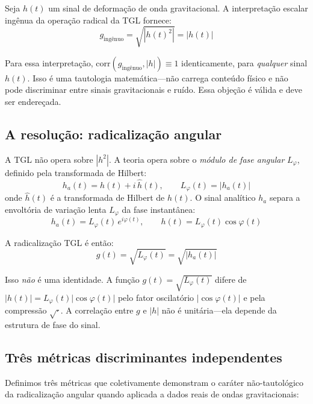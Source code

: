 \documentclass[12pt,a4paper,twocolumn]{article}
\begin{document}
Seja $h(t)$ um sinal de deformação de onda gravitacional. A interpretação escalar ingênua da operação radical da TGL fornece:
\begin{equation}
\label{eq:tautology}
g_{\text{ingênuo}} = \sqrt{|h(t)^2|} = |h(t)|
\end{equation}

Para essa interpretação, $\text{corr}(g_{\text{ingênuo}}, |h|) \equiv 1$ identicamente, para \emph{qualquer} sinal $h(t)$. Isso é uma tautologia matemática---não carrega conteúdo físico e não pode discriminar entre sinais gravitacionais e ruído. Essa objeção é válida e deve ser endereçada.

\subsection{A resolução: radicalização angular}

A TGL não opera sobre $|h^2|$. A teoria opera sobre o \emph{módulo de fase angular} $L_\varphi$, definido pela transformada de Hilbert:
\begin{equation}
\label{eq:angular}
h_a(t) = h(t) + i\,\hat{h}(t), \qquad L_\varphi(t) = |h_a(t)|
\end{equation}
onde $\hat{h}(t)$ é a transformada de Hilbert de $h(t)$. O sinal analítico $h_a$ separa a envoltória de variação lenta $L_\varphi$ da fase instantânea:
\begin{equation}
h_a(t) = L_\varphi(t)\,e^{i\varphi(t)}, \qquad h(t) = L_\varphi(t)\cos\varphi(t)
\end{equation}

A radicalização TGL é então:
\begin{equation}
\label{eq:anti-tautology}
g(t) = \sqrt{L_\varphi(t)} = \sqrt{|h_a(t)|}
\end{equation}

Isso \emph{não} é uma identidade. A função $g(t) = \sqrt{L_\varphi(t)}$ difere de $|h(t)| = L_\varphi(t)|\cos\varphi(t)|$ pelo fator oscilatório $|\cos\varphi(t)|$ e pela compressão $\sqrt{\cdot}$. A correlação entre $g$ e $|h|$ não é unitária---ela depende da estrutura de fase do sinal.

\subsection{Três métricas discriminantes independentes}

Definimos três métricas que coletivamente demonstram o caráter não-tautológico da radicalização angular quando aplicada a dados reais de ondas gravitacionais:
\end{document}
